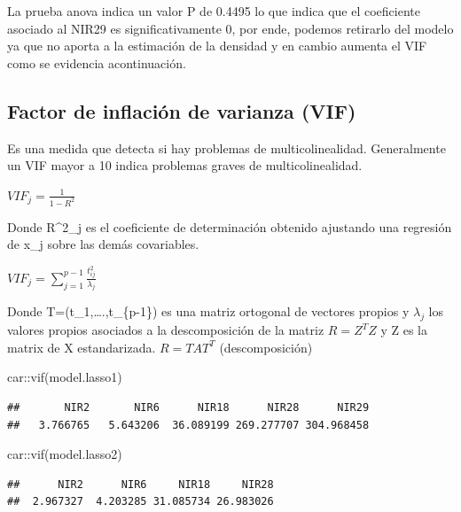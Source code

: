 \documentclass[
]{article}
\newenvironment{Shaded}{\begin{snugshade}}{\end{snugshade}}
\newcommand{\FunctionTok}[1]{\textcolor[rgb]{0.00,0.00,0.00}{#1}}
\newcommand{\NormalTok}[1]{#1}
\newcommand{\SpecialCharTok}[1]{\textcolor[rgb]{0.00,0.00,0.00}{#1}}
\begin{document}
La prueba anova indica un valor P de 0.4495 lo que indica que el
coeficiente asociado al NIR29 es significativamente 0, por ende, podemos
retirarlo del modelo ya que no aporta a la estimación de la densidad y
en cambio aumenta el VIF como se evidencia acontinuación.

\hypertarget{factor-de-inflaciuxf3n-de-varianza-vif}{%
\subsection{Factor de inflación de varianza
(VIF)}\label{factor-de-inflaciuxf3n-de-varianza-vif}}

Es una medida que detecta si hay problemas de multicolinealidad.
Generalmente un VIF mayor a 10 indica problemas graves de
multicolinealidad.

\(VIF_j = \frac{1}{1-R^2}\)

Donde R\^{}2\_j es el coeficiente de determinación obtenido ajustando
una regresión de x\_j sobre las demás covariables.

\(VIF_j = \sum_{j=1}^{p-1}\frac{t^2_{ij}}{\lambda_j}\)

Donde T=(t\_1,\ldots.,t\_\{p-1\}) es una matriz ortogonal de vectores
propios y \(\lambda_j\) los valores propios asociados a la
descomposición de la matriz \(R=Z^TZ\) y Z es la matrix de X
estandarizada. \(R=TAT^T\) (descomposición)

\begin{Shaded}
\begin{Highlighting}[]
\NormalTok{car}\SpecialCharTok{::}\FunctionTok{vif}\NormalTok{(model.lasso1)}
\end{Highlighting}
\end{Shaded}

\begin{verbatim}
##       NIR2       NIR6      NIR18      NIR28      NIR29 
##   3.766765   5.643206  36.089199 269.277707 304.968458
\end{verbatim}

\begin{Shaded}
\begin{Highlighting}[]
\NormalTok{car}\SpecialCharTok{::}\FunctionTok{vif}\NormalTok{(model.lasso2)}
\end{Highlighting}
\end{Shaded}

\begin{verbatim}
##      NIR2      NIR6     NIR18     NIR28 
##  2.967327  4.203285 31.085734 26.983026
\end{verbatim}
\end{document}
